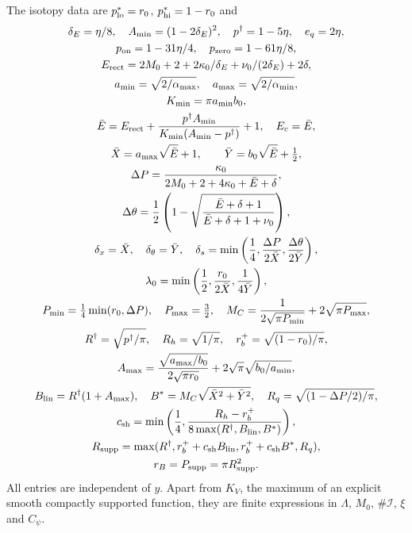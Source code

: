 \begin{definition}
The isotopy data are $p^*_{\rm lo}=r_0$, $p^*_{\rm hi}=1-r_0$ and
\begin{gather*}
 \delta_E=\eta/8,\quad A_{\min}=(1-2\delta_E)^2,\quad
 p^\dagger=1-5\eta,\quad e_q=2\eta,\\
 p_{\rm on}=1-31\eta/4,\quad p_{\rm zero}=1-61\eta/8,\\
 E_{\rm rect}=2M_0+2+2\kappa_0/\delta_E+\nu_0/(2\delta_E)+2\delta,\\
 a_{\min}=\sqrt{2/\alpha_{\max}},\quad a_{\max}=\sqrt{2/\alpha_{\min}},\\
 K_{\min}=\pi a_{\min}b_0,\\
 \bar E=E_{\rm rect}+\frac{p^\dagger A_{\min}}{K_{\min}(A_{\min}-p^\dagger)}+1,\quad E_c=\bar E,\\
 \bar X=a_{\max}\sqrt{\bar E}+1,\qquad
 \bar Y=b_0\sqrt{\bar E}+\tfrac12,\\
 \Delta P=\frac{\kappa_0}{2M_0+2+4\kappa_0+\bar E+\delta},\\
 \Delta\theta=\frac12\left(1-\sqrt{\frac{\bar E+\delta+1}{\bar E+\delta+1+\nu_0}}\right),\\
 \delta_x=\bar X,\quad\delta_\theta=\bar Y,\quad
 \delta_s=\min\left(\frac14,\frac{\Delta P}{2\bar X},\frac{\Delta\theta}{2\bar Y}\right),\\
 \lambda_0=\min\left(\frac12,\frac{r_0}{2\bar X},\frac1{4\bar Y}\right),\\
 P_{\min}=\tfrac14\min(r_0,\Delta P),\quad P_{\max}=\tfrac32,\quad
 M_C=\frac1{2\sqrt{\pi P_{\min}}}+2\sqrt{\pi P_{\max}},\\
 R^\dagger=\sqrt{p^\dagger/\pi},\quad R_h=\sqrt{1/\pi},\quad r_b^+=\sqrt{(1-r_0)/\pi},\\
 A_{\max}=\frac{\sqrt{a_{\max}/b_0}}{2\sqrt{\pi r_0}}+
             2\sqrt\pi\sqrt{b_0/a_{\min}},\\
 B_{\rm lin}=R^\dagger(1+A_{\max}),\quad
 B^*=M_C\sqrt{\bar X^2+\bar Y^2},\quad
 R_q=\sqrt{(1-\Delta P/2)/\pi},\\
 c_{\rm sh}=\min\left(\frac14,
 \frac{R_h-r_b^+}{8\max(R^\dagger,B_{\rm lin},B^*)}\right),\\
 R_{\rm supp}=\max(R^\dagger,r_b^++c_{\rm sh}B_{\rm lin},
                       r_b^++c_{\rm sh}B^*,R_q),\\
 r_B=P_{\rm supp}=\pi R_{\rm supp}^2.
\end{gather*}
All entries are independent of $y$. Apart from $K_V$, the maximum of an explicit smooth compactly supported
function, they are finite expressions in $\Lambda$, $M_0$, $\#\mathcal I$, $\xi$ and $C_\psi$.
\end{definition}

